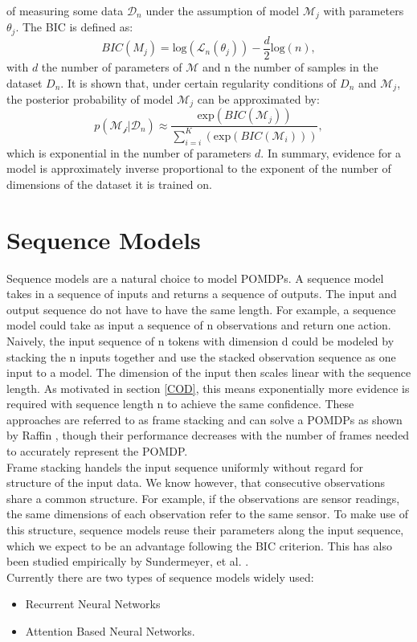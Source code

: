 of measuring some data $\mathcal{D}_n$ under the assumption of model $\mathcal{M}_j$ with parameters $\theta_j$. The BIC is defined as:
\begin{equation}
    BIC(M_j) = \text{log}(\mathcal{L}_n(\theta_j)) - \frac{d}{2} \text{log}(n),
\end{equation}
with $d$ the number of parameters of $\mathcal{M}$ and n the number of samples in the dataset $D_n$.
It is shown that, under certain regularity conditions of $D_n$ and $\mathcal{M}_j$, the posterior probability of model $\mathcal{M}_j$ can be approximated by:
\begin{equation}
    p(\mathcal{M_j}|\mathcal{D}_n) \approx \frac{\text{exp}(BIC(\mathcal{M}_j))}{\sum_{i=i}^K(\text{exp}(BIC(\mathcal{M}_i)))},
\end{equation}
which is exponential in the number of parameters $d$.
In summary, evidence for a model is approximately inverse proportional to the exponent of the number of dimensions of the dataset it is trained on.

\section{Sequence Models}
Sequence models are a natural choice to model POMDPs. 
A sequence model takes in a sequence of inputs and returns a sequence of outputs. The input and output sequence do not have to have the same length. For example, 
a sequence model could take as input a sequence of n observations and return one action. \\ 
Naively, the input sequence of n tokens with dimension d could be modeled by stacking the n inputs together and use the stacked observation sequence as one 
input to a model. The dimension of the input then scales linear with the sequence length. As motivated in section \ref{COD}, this means exponentially more evidence is 
required with sequence length n to achieve the same confidence. These approaches are referred to as frame stacking and can solve a POMDPs as shown by Raffin 
\cite{framestacking}, though 
their performance decreases with the number of frames needed to accurately represent the POMDP. \\
Frame stacking handels the input sequence uniformly without regard for structure of the input data. We know however, that consecutive observations share a common 
structure. For example, if the observations are sensor readings, the same dimensions of each observation refer to the same sensor. To make use of this structure, 
sequence models reuse their parameters along the input sequence, which we expect to be an advantage following the BIC criterion. This has also been studied empirically 
by Sundermeyer, et al. \cite{6639310}.\\
Currently there are two types of sequence models widely used:
\begin{itemize}
    \item Recurrent Neural Networks
    \item Attention Based Neural Networks.
\end{itemize}

